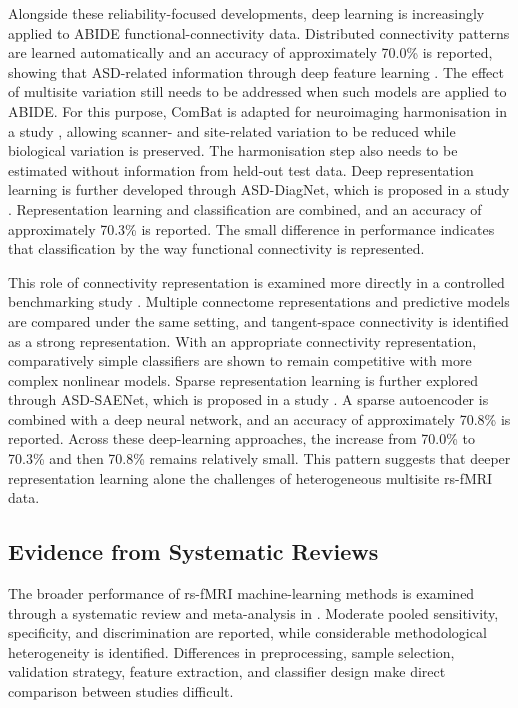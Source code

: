 Alongside these reliability-focused developments, deep learning is increasingly applied to ABIDE functional-connectivity data. Distributed connectivity patterns are learned automatically and an accuracy of approximately 70.0\% is reported, showing that ASD-related information  through deep feature learning \citep{Heinsfeldetal2018}. The effect of multisite variation still needs to be addressed when such models are applied to ABIDE. For this purpose, ComBat is adapted for neuroimaging harmonisation in a study \citep{Fortinetal2018}, allowing scanner- and site-related variation to be reduced while biological variation is preserved. The harmonisation step also needs to be estimated without information from held-out test data. Deep representation learning is further developed through ASD-DiagNet, which is proposed in a study \citep{Eslamietal2019}. Representation learning and classification are combined, and an accuracy of approximately 70.3\% is reported. The small difference in performance indicates that classification  by the way functional connectivity is represented.

This role of connectivity representation is examined more directly in a controlled benchmarking study \citep{Dadietal2019}. Multiple connectome representations and predictive models are compared under the same setting, and tangent-space connectivity is identified as a strong representation. With an appropriate connectivity representation, comparatively simple classifiers are shown to remain competitive with more complex nonlinear models. Sparse representation learning is further explored through ASD-SAENet, which is proposed in a study \citep{AlmuqhimSaeed2021}. A sparse autoencoder is combined with a deep neural network, and an accuracy of approximately 70.8\% is reported. Across these deep-learning approaches, the increase from 70.0\% to 70.3\% and then 70.8\% remains relatively small. This pattern suggests that deeper representation learning alone  the challenges of heterogeneous multisite rs-fMRI data.


\subsection{Evidence from Systematic Reviews}

The broader performance of rs-fMRI machine-learning methods is examined through a systematic review and meta-analysis in \cite{Santanaetal2022}. Moderate pooled sensitivity, specificity, and discrimination are reported, while considerable methodological heterogeneity is identified. Differences in preprocessing, sample selection, validation strategy, feature extraction, and classifier design make direct comparison between studies difficult.

